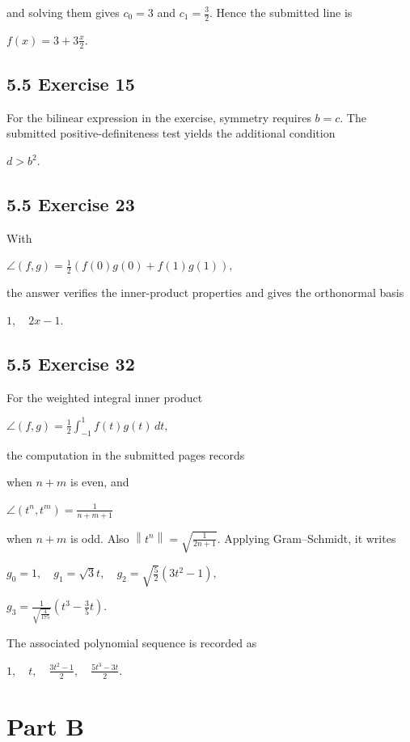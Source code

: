 and solving them gives \(c_{0} = 3\) and \(c_{1} = \frac{3}{2}\). Hence the submitted line is

\(f(x) = 3 + 3\frac{x}{2}.\)

\section{5.5 Exercise 15}

For the bilinear expression in the exercise, symmetry requires \(b = c\). The submitted positive-definiteness test yields the additional condition

\(d > b^{2}.\)

\section{5.5 Exercise 23}

With

\(\angle\left( {f,g} \right) = \frac{1}{2}\left( {f(0)g(0) + f(1)g(1)} \right),\)

the answer verifies the inner-product properties and gives the orthonormal basis

\(1,\quad 2x - 1.\)

\section{5.5 Exercise 32}

For the weighted integral inner product

\(\angle\left( {f,g} \right) = \frac{1}{2}\int_{- 1}^{1}f(t)g(t)\, dt,\)

the computation in the submitted pages records

when \(n + m\) is even, and

\(\angle\left( {t^{n},t^{m}} \right) = \frac{1}{n + m + 1}\)

when \(n + m\) is odd. Also \(\left\| t^{n} \right\| = \sqrt{\frac{1}{2n + 1}}\). Applying Gram--Schmidt, it writes

\(g_{0} = 1,\quad g_{1} = \sqrt{3}t,\quad g_{2} = \sqrt{\frac{5}{2}}\left( {3t^{2} - 1} \right),\)

\(g_{3} = \frac{1}{\sqrt{\frac{4}{175}}}\left( {t^{3} - \frac{3}{5}t} \right).\)

The associated polynomial sequence is recorded as

\(1,\quad t,\quad\frac{3t^{2} - 1}{2},\quad\frac{5t^{3} - 3t}{2}.\)

\chapter{Part B}

